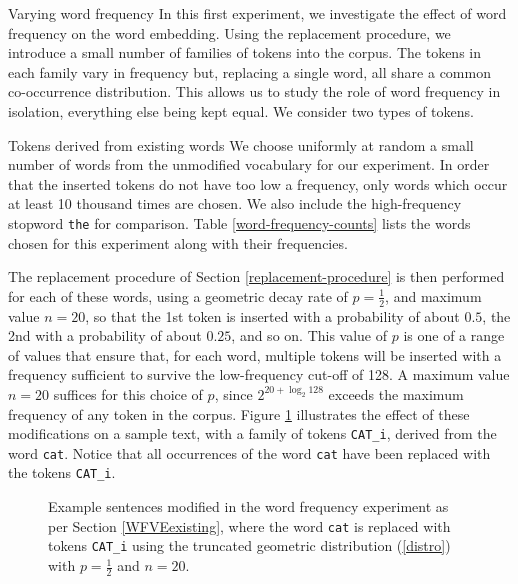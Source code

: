 \documentclass{article} %
\newcommand{\word}[1]{\texttt{#1}}
\begin{document}
\begin{section}{Varying word frequency}\label{WFVE}
In this first experiment, we investigate the effect of word frequency on
the word embedding.  Using the replacement procedure, we introduce a
small number of families of tokens into the corpus.  The tokens in each
family vary in frequency but, replacing a single word, all share a
common co-occurrence distribution.  This allows us to study the role of
word frequency in isolation, everything else being kept equal.  We
consider two types of tokens.

\begin{subsection}{Tokens derived from existing words}\label{WFVEexisting}
We choose uniformly at random a small number of words from the
unmodified vocabulary for our experiment.  In order that the inserted
tokens do not have too low a frequency, only words which occur at least
10 thousand times are chosen.  We also include the high-frequency
stopword \word{the} for comparison.  Table \ref{word-frequency-counts}
lists the words chosen for this experiment along with their frequencies.

The replacement procedure of Section \ref{replacement-procedure} is then
performed for each of these words, using a geometric decay rate of $p =
\tfrac{1}{2}$, and maximum value $n=20$, so that the 1st token is
inserted with a probability of about $0.5$, the 2nd with a probability of
about $0.25$, and so on.  This value of $p$ is one of a range of values
that ensure that, for each word, multiple tokens will be inserted with a
frequency sufficient to survive the low-frequency cut-off of
128.  A maximum value $n=20$ suffices for this choice of $p$, since
$2^{20 + \log_2{128}}$ exceeds the maximum frequency of any token in
the corpus.  Figure \ref{fig:word-frequency-experiment-text-cat}
illustrates the effect of these modifications on a sample text, with a
family of tokens \word{CAT\_i}, derived from the word \word{cat}.
Notice that all occurrences of the word \word{cat} have been replaced
with the tokens \word{CAT\_i}.

\begin{table}
	
	\caption{Words chosen for the word frequency variation experiment, along with their frequency in the unmodified corpus. }
	\label{word-frequency-counts}
\end{table}

\begin{figure}
	\begin{mdframed}
	
	\end{mdframed}
	\caption{Example sentences modified in the word frequency
          experiment as per Section \ref{WFVEexisting}, where the word
          \word{cat} is replaced with tokens \word{CAT\_i} using the
          truncated geometric distribution (\ref{distro}) with
          $p=\tfrac{1}{2}$ and $n=20$.}
	\label{fig:word-frequency-experiment-text-cat}
\end{figure}


\end{subsection}
\end{section}
\end{document}
